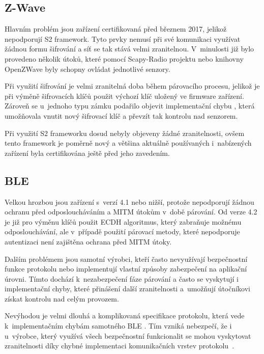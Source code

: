  \subsection{Z-Wave}
 Hlavním problém jsou zařízení certifikovaná před březnem 2017, jelikož nepodporují S2 framework.
 Tyto prvky nemusí při své komunikaci využívat žádnou formu šifrování a síť se tak stává 
 velmi zranitelnou. V~minulosti již bylo provedeno několik útoků, které pomocí
 Scapy-Radio projektu \cite{ezwave} nebo knihovny OpenZWave  byly schopny ovládat jednotlivé senzory. 
 
 Při využití šifrování je velmi zranitelná doba během párovacího procesu, jelikož je při výměně
 šifrovacích klíčů použit výchozí klíč uložený ve firmware zařízení. Zároveň se 
 u~jednoho typu zámku podařilo objevit implementační chybu \cite{zwave-S0-attack}, která umožňovala vnutit 
 nový šifrovací klíč a převzít tak kontrolu nad senzorem. 
 
 Při využití S2 frameworku dosud nebyly objeveny žádné zranitelnosti, ovšem tento
 framework je poměrně nový a většina aktuálně používaných i~nabízených zařízení byla certifikována 
 ještě před jeho zavedením.
 
 \subsection{BLE}
 Velkou hrozbou jsou zařízení s~verzí 4.1 nebo nižší, protože nepodporují žádnou ochranu před 
 odposloucháváním a MITM útokům v~době párování. Od verze 4.2 je již pro výměnu klíčů použit ECDH 
 algoritmus, který zabraňuje možnému odposlouchávání, ale v~případě použití párovací metody, které
 nepodporuje autentizaci není zajištěna ochrana před MITM útoky.  \cite{cesnet-survey}
 
 Dalším problémem jsou samotní výrobci, kteří často nevyužívají bezpečnostní funkce protokolu  \cite{ble-locks} nebo
 implementují vlastní způsoby zabezpečení na aplikační úrovni. Tímto dochází k~nezabezpečení fáze 
 párování a často se vyskytují i implementační chyby, které přinášení další zranitelnosti \cite{ble-attack} 
 a~umožňují útočníkovi získat kontrolu nad celým provozem.  \cite{cesnet-survey}
 
 Nevýhodou je velmi dlouhá a komplikovaná specifikace protokolu, která vede k~implementačním 
 chybám samotného BLE \cite{blueborne}. Tím vzniká nebezpečí, že i u~výrobce, který využívá
 všech bezpečnostní funkcionalit
 se mohou vyskytovat zranitelnosti díky chybné implementaci komunikačních vrstev protokolu~\cite{cesnet-survey}.
 
